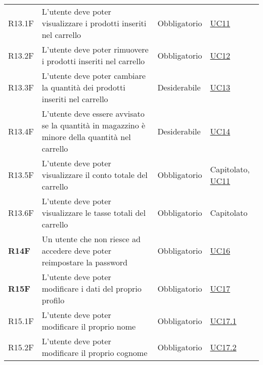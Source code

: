 \begin{center}
\begin{longtable}[!h]{p{50px} p{245px} p{75px} p{50px}}
        R13.1F                                & L'utente deve poter visualizzare i prodotti inseriti nel carrello                                   & Obbligatorio             & \hyperref[sec:UC11]{UC11}                      \\
        R13.2F                                & L'utente deve poter rimuovere i prodotti inseriti nel carrello                                      & Obbligatorio             & \hyperref[sec:UC12]{UC12}                      \\
        R13.3F                                & L'utente deve poter cambiare la quantità dei prodotti inseriti nel carrello                         & Desiderabile             & \hyperref[sec:UC13]{UC13}                      \\
        R13.4F                                & L'utente deve essere avvisato se la quantità in magazzino è minore della quantità nel carrello      & Desiderabile             & \hyperref[sec:UC14]{UC14}                      \\
        R13.5F                                & L'utente deve poter visualizzare il conto totale del carrello                                       & Obbligatorio             & Capitolato, \newline \hyperref[sec:UC11]{UC11} \\
        R13.6F                                & L'utente deve poter visualizzare le tasse totali del carrello                                       & Obbligatorio             & Capitolato                                     \\
        \textbf{R14F}                         & Un utente che non riesce ad accedere deve poter reimpostare la password                             & Obbligatorio             & \hyperref[sec:UC16]{UC16}                      \\
        \textbf{R15F}                         & L'utente deve poter modificare i dati del proprio profilo                                           & Obbligatorio             & \hyperref[sec:UC17]{UC17}                      \\
        R15.1F                                & L'utente deve poter modificare il proprio nome                                                      & Obbligatorio             & \hyperref[sec:UC17.1]{UC17.1}                  \\
        R15.2F                                & L'utente deve poter modificare il proprio cognome                                                   & Obbligatorio             & \hyperref[sec:UC17.2]{UC17.2}                  \\

\end{longtable}
\end{center}
